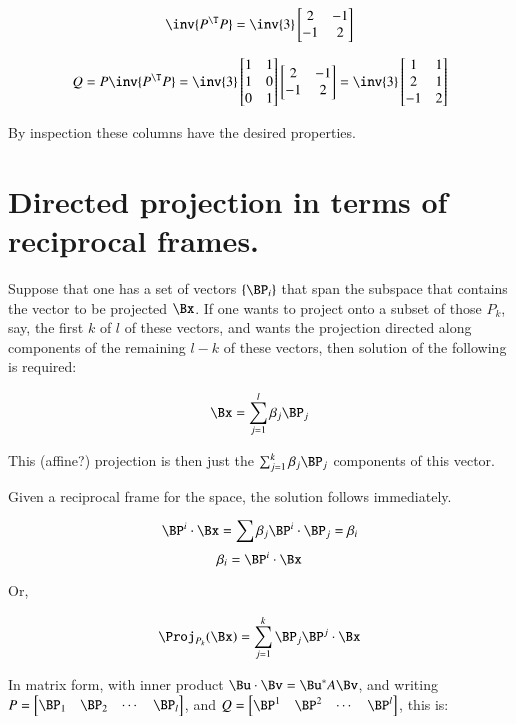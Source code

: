 \[
\inv{P^\T P} = 
\inv{3}
\begin{bmatrix}
2 & -1 \\
-1 & 2 \\
\end{bmatrix}
\]

\[
Q = P \inv{P^\T P} = 
\inv{3}
\begin{bmatrix}
1 & 1 \\
1 & 0 \\
0 & 1 \\
\end{bmatrix}
\begin{bmatrix}
2 & -1 \\
-1 & 2 \\
\end{bmatrix}
=
\inv{3}
\begin{bmatrix}
1 & 1 \\
2 & 1 \\
-1 & 2 \\
\end{bmatrix}
\]

By inspection these columns have the desired properties.

\section{Directed projection in terms of reciprocal frames. }

Suppose that one has a set of vectors $\{\BP_i\}$ that span the subspace that contains the vector
to be projected $\Bx$.   If one wants to project onto a subset of those $P_k$,
say, the first $k$ of $l$ of these vectors, and wants the projection directed along components
of the remaining $l-k$ of these vectors, then solution of the following is required:

\begin{equation*}
\Bx = \sum_{j=1}^{l} \beta_j \BP_j
\end{equation*}

This (affine?) projection is then just the $\sum_{j=1}^k \beta_j \BP_j$ components of this vector.

Given a reciprocal frame for the space, the solution follows immediately.

\[
\BP^i \cdot \Bx = \sum \beta_j \BP^i \cdot \BP_j = \beta_i
\]
\[
\beta_i = \BP^i \cdot \Bx
\]

Or, 

\[
\Proj_{P_k}(\Bx) = \sum_{j=1}^k \BP_j \BP^j \cdot \Bx
\]

In matrix form, with inner product $\Bu \cdot \Bv = \Bu^* A \Bv$, and writing 
$P = 
\begin{bmatrix}
\BP_1 & \BP_2 & \cdots & \BP_l
\end{bmatrix}$, and $Q =
\begin{bmatrix}
\BP^1 & \BP^2 & \cdots & \BP^l
\end{bmatrix}$,
this is:

